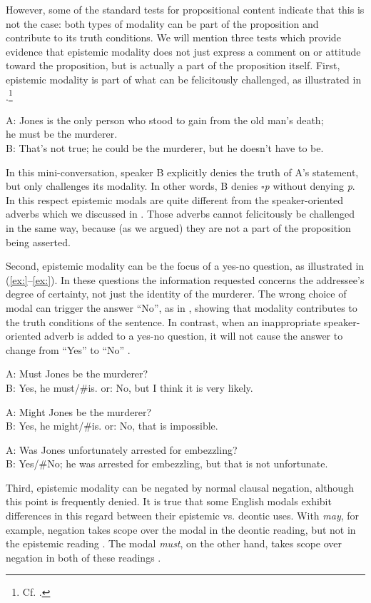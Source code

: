 However, some of the standard tests for propositional content indicate that this is not the case: both types of modality can be part of the proposition and contribute to its truth conditions. We will mention three tests which provide evidence that epistemic modality does not just express a comment on or attitude toward the proposition, but is actually a part of the proposition itself. First, epistemic modality is part of what can be felicitously challenged, as illustrated in .\footnote{Cf. \citet[1698]{Papafragou2006}.}


\ea
A: Jones is the only person who stood to gain from the old man’s death;\\
  he must be the murderer.\\
B: That’s not true; he could be the murderer, but he doesn’t have to be.
\z


In this mini-conversation, speaker B explicitly denies the truth of A’s statement, but only challenges its modality. In other words, B denies \textit{${\square}$p} without denying \textit{p}. In this respect epistemic modals are quite different from the speaker-oriented adverbs which we discussed in . Those adverbs cannot felicitously be challenged in the same way, because (as we argued) they are not a part of the proposition being asserted.



Second, epistemic modality can be the focus of a yes-no question, as illustrated in (\ref{ex:}--\ref{ex:}). In these questions the information requested concerns the addressee’s degree of certainty, not just the identity of the murderer. The wrong choice of modal can trigger the answer “No”, as in , showing that modality contributes to the truth conditions of the sentence. In contrast, when an inappropriate speaker-oriented adverb is added to a yes-no question, it will not cause the answer to change from “Yes” to “No” .


\ea
A: Must Jones be the murderer?\\
B: Yes, he must/\#is.  or: No, but I think it is very likely.
\z

\ea
A: Might Jones be the murderer?\\
B: Yes, he might/\#is.  or: No, that is impossible.
\z

\ea
A: Was Jones unfortunately arrested for embezzling?\\
B: Yes/\#No; he was arrested for embezzling, but that is not unfortunate.
\z


Third, epistemic modality can be negated by normal clausal negation, although this point is frequently denied. It is true that some English modals exhibit differences in this regard between their epistemic vs. deontic uses. With \textit{may}, for example, negation takes scope over the modal in the deontic reading, but not in the epistemic reading . The modal \textit{must}, on the other hand, takes scope over negation in both of these readings .


